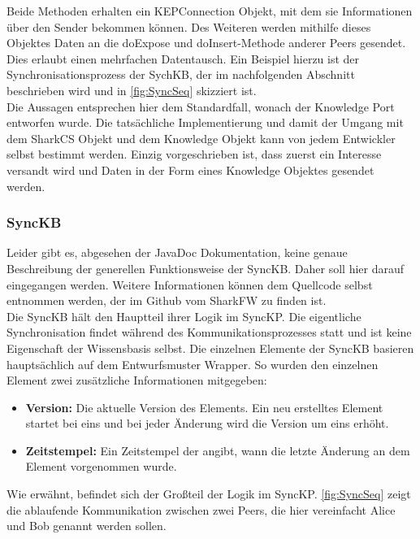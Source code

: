 \documentclass[a4paper]{article}
\begin{document}
	Beide Methoden erhalten ein KEPConnection Objekt, mit dem sie Informationen 
	über den Sender bekommen können. Des Weiteren werden mithilfe dieses 
	Objektes Daten an die doExpose und doInsert-Methode anderer Peers gesendet.
	Dies erlaubt einen mehrfachen Datentausch. Ein Beispiel hierzu ist
	der Synchronisationsprozess der SychKB, der im nachfolgenden Abschnitt
	beschrieben wird und in \autoref{fig:SyncSeq} skizziert ist. \\
	
	Die Aussagen entsprechen hier dem Standardfall, wonach
	der Knowledge Port entworfen wurde. Die tatsächliche Implementierung und
	damit der Umgang mit dem SharkCS Objekt und dem Knowledge Objekt kann von jedem
	Entwickler selbst bestimmt werden. Einzig vorgeschrieben ist, dass zuerst
	ein Interesse versandt wird und Daten in der Form eines Knowledge Objektes
	gesendet werden.
	
	\subsubsection{SyncKB}
	\label{sec:SyncKB}
	
	Leider gibt es, abgesehen der JavaDoc Dokumentation, keine genaue
	Beschreibung der generellen Funktionsweise der SyncKB. Daher soll hier darauf
	eingegangen werden. Weitere Informationen
	können dem Quellcode selbst entnommen werden, der im Github vom SharkFW
	zu finden ist. \cite{SyncKB} \\
	
	Die SyncKB hält den Hauptteil ihrer Logik im SyncKP. Die eigentliche
	Synchronisation findet während des Kommunikationsprozesses statt und ist
	keine Eigenschaft der Wissensbasis selbst. Die einzelnen Elemente der SyncKB
	basieren hauptsächlich auf dem Entwurfsmuster Wrapper. So wurden den einzelnen
	Element zwei zusätzliche Informationen mitgegeben: 
	
	\begin{itemize}
		\item \textbf{Version:} Die aktuelle Version des Elements. Ein neu 
		erstelltes Element startet bei eins und bei jeder Änderung wird die
		Version um eins erhöht.
		\item \textbf{Zeitstempel:} Ein Zeitstempel der angibt, wann die letzte
		Änderung an dem Element vorgenommen wurde.
	\end{itemize} 
	
	Wie erwähnt, befindet sich der Großteil der Logik im SyncKP.
	\autoref{fig:SyncSeq} zeigt die ablaufende Kommunikation zwischen zwei
	Peers, die hier vereinfacht Alice und Bob genannt werden sollen.	
	
\end{document}
